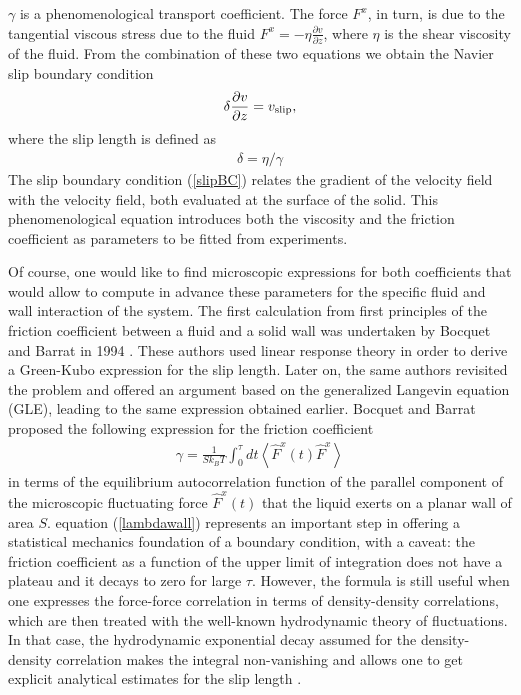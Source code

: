\documentclass[b5paper,openright,10pt]{book}
\newcommand{\llangle}{\left\langle}
\newcommand{\rrangle}{\right\rangle}
\begin{document}
$\gamma$ is a phenomenological transport coefficient.  The
force $F^x$, in  turn, is due to the tangential  viscous stress due to
the fluid  $F^x=-\eta \frac{\partial  v}{\partial z}$, where  $\eta$ is
the shear  viscosity of the fluid.  From the combination of  these two
equations we obtain the Navier slip boundary condition
\begin{align}
  \delta  \frac{\partial v}{\partial z}=v_{\rm slip},
\label{slipBC}
\end{align}
where the slip length  is defined as
\begin{align}
  \delta=\eta/\gamma
\end{align}
The slip boundary condition (\ref{slipBC}) relates the gradient of the
velocity field with the velocity  field, both evaluated at the surface
of  the solid.   This  phenomenological equation  introduces both  the
viscosity and the friction coefficient as parameters to be fitted from
experiments. 

Of course,  one would  like to find  microscopic expressions  for both
coefficients that would  allow to compute in  advance these parameters
for the specific fluid and wall  interaction of the system.  The first
calculation from first principles  of the friction coefficient between
a fluid and a solid wall was  undertaken by Bocquet and Barrat in 1994
\cite{Bocquet1994}. These  authors used
linear  response  theory   in   order  to  derive  a  Green-Kubo
expression  for the  slip length.   Later  on, the  same authors  
revisited the problem and offered an argument based on the generalized
Langevin  equation  (GLE), leading  to  the  same expression  obtained
earlier\cite{Bocquet2013}.  Bocquet and Barrat proposed the following  expression for
the friction coefficient
\begin{align}
  \gamma=\frac{1}{Sk_BT}\int_0^{\tau} dt \llangle \hat{F}^x(t)\hat{F}^x\rrangle
\label{lambdawall}
\end{align}
in terms of  the equilibrium autocorrelation function  of the parallel
component of the microscopic fluctuating force $\hat{F}^x(t)$ that the
liquid exerts on  a planar wall of area  $S$.  equation  (\ref{lambdawall})
represents  an  important step  in  offering  a statistical  mechanics
foundation  of  a boundary  condition,  with  a caveat:  the  friction
coefficient as a  function of the upper limit of  integration does not
have a plateau  and it decays to zero for  large $\tau$. 
However, the
formula is still useful when one expresses the force-force correlation
in terms of density-density correlations,  which are then treated with
the well-known hydrodynamic theory of fluctuations.  In that case, the
hydrodynamic  exponential   decay  assumed  for   the  density-density
correlation makes  the integral  non-vanishing and  allows one  to get
explicit     analytical    estimates     for    the     slip    length
\cite{Barrat1999,Bocquet2007,Kobryn2008,Kobryn2011}.
\end{document}
